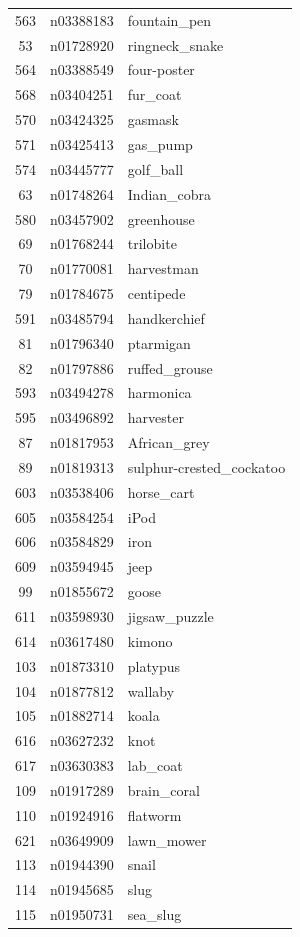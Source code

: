 \begin{table}
\begin{tabular}{cll}
563 & n03388183 & fountain_pen \\
53 & n01728920 & ringneck_snake \\
564 & n03388549 & four-poster \\
568 & n03404251 & fur_coat \\
570 & n03424325 & gasmask \\
571 & n03425413 & gas_pump \\
574 & n03445777 & golf_ball \\
63 & n01748264 & Indian_cobra \\
580 & n03457902 & greenhouse \\
69 & n01768244 & trilobite \\
70 & n01770081 & harvestman \\
79 & n01784675 & centipede \\
591 & n03485794 & handkerchief \\
81 & n01796340 & ptarmigan \\
82 & n01797886 & ruffed_grouse \\
593 & n03494278 & harmonica \\
595 & n03496892 & harvester \\
87 & n01817953 & African_grey \\
89 & n01819313 & sulphur-crested_cockatoo \\
603 & n03538406 & horse_cart \\
605 & n03584254 & iPod \\
606 & n03584829 & iron \\
609 & n03594945 & jeep \\
99 & n01855672 & goose \\
611 & n03598930 & jigsaw_puzzle \\
614 & n03617480 & kimono \\
103 & n01873310 & platypus \\
104 & n01877812 & wallaby \\
105 & n01882714 & koala \\
616 & n03627232 & knot \\
617 & n03630383 & lab_coat \\
109 & n01917289 & brain_coral \\
110 & n01924916 & flatworm \\
621 & n03649909 & lawn_mower \\
113 & n01944390 & snail \\
114 & n01945685 & slug \\
115 & n01950731 & sea_slug \\

\end{tabular}
\end{table}
